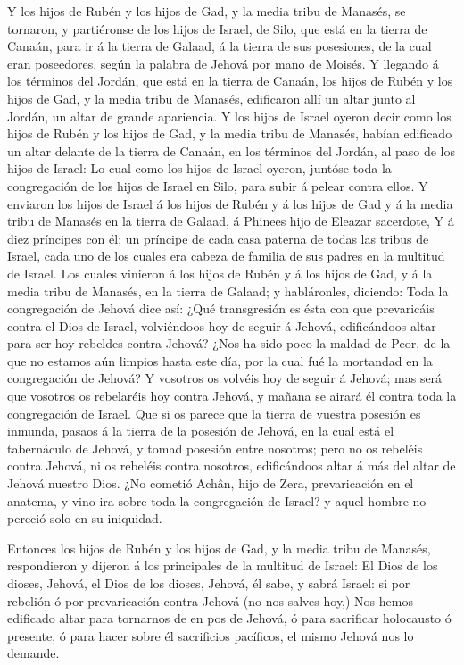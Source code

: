  Y los hijos de Rubén y los hijos de Gad, y la media tribu
de Manasés, se tornaron, y partiéronse de los hijos de Israel, de Silo,
que está en la tierra de Canaán, para ir á la tierra de Galaad, á la
tierra de sus posesiones, de la cual eran poseedores, según la palabra
de Jehová por mano de Moisés.  Y llegando á los términos
del Jordán, que está en la tierra de Canaán, los hijos de Rubén y los
hijos de Gad, y la media tribu de Manasés, edificaron allí un altar
junto al Jordán, un altar de grande apariencia.  Y los
hijos de Israel oyeron decir como los hijos de Rubén y los hijos de Gad,
y la media tribu de Manasés, habían edificado un altar delante de la
tierra de Canaán, en los términos del Jordán, al paso de los hijos de
Israel:  Lo cual como los hijos de Israel oyeron, juntóse
toda la congregación de los hijos de Israel en Silo, para subir á pelear
contra ellos.  Y enviaron los hijos de Israel á los hijos
de Rubén y á los hijos de Gad y á la media tribu de Manasés en la tierra
de Galaad, á Phinees hijo de Eleazar sacerdote,  Y á diez
príncipes con él; un príncipe de cada casa paterna de todas las tribus
de Israel, cada uno de los cuales era cabeza de familia de sus padres en
la multitud de Israel.  Los cuales vinieron á los hijos de
Rubén y á los hijos de Gad, y á la media tribu de Manasés, en la tierra
de Galaad; y habláronles, diciendo:  Toda la congregación
de Jehová dice así: ¿Qué transgresión es ésta con que prevaricáis contra
el Dios de Israel, volviéndoos hoy de seguir á Jehová, edificándoos
altar para ser hoy rebeldes contra Jehová?  ¿Nos ha sido
poco la maldad de Peor, de la que no estamos aún limpios hasta este día,
por la cual fué la mortandad en la congregación de Jehová? 
Y vosotros os volvéis hoy de seguir á Jehová; mas será que vosotros os
rebelaréis hoy contra Jehová, y mañana se airará él contra toda la
congregación de Israel.  Que si os parece que la tierra de
vuestra posesión es inmunda, pasaos á la tierra de la posesión de
Jehová, en la cual está el tabernáculo de Jehová, y tomad posesión entre
nosotros; pero no os rebeléis contra Jehová, ni os rebeléis contra
nosotros, edificándoos altar á más del altar de Jehová nuestro Dios.
 ¿No cometió Achân, hijo de Zera, prevaricación en el
anatema, y vino ira sobre toda la congregación de Israel? y aquel hombre
no pereció solo en su iniquidad.

 Entonces los hijos de Rubén y los hijos de Gad, y la media
tribu de Manasés, respondieron y dijeron á los principales de la
multitud de Israel:  El Dios de los dioses, Jehová, el Dios
de los dioses, Jehová, él sabe, y sabrá Israel: si por rebelión ó por
prevaricación contra Jehová (no nos salves hoy,)  Nos hemos
edificado altar para tornarnos de en pos de Jehová, ó para sacrificar
holocausto ó presente, ó para hacer sobre él sacrificios pacíficos, el
mismo Jehová nos lo demande.


